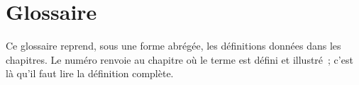 
\chapter{Glossaire}
\label{ann:glossaire}

Ce glossaire reprend, sous une forme abrégée, les définitions données dans
les chapitres. Le numéro renvoie au chapitre où le terme est défini et
illustré~; c'est là qu'il faut lire la définition complète.

